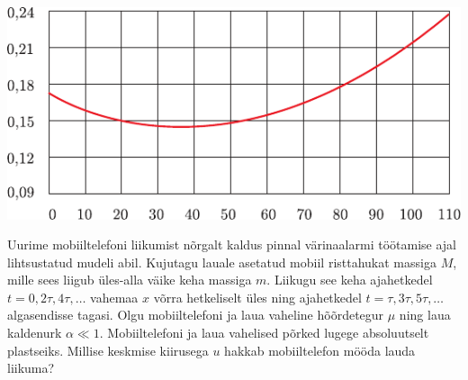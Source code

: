 \documentclass[10pt, twoside]{article}
\begin{document}
{\begin{center}
	\includegraphics[width=\linewidth]{2006-lahg-10-yl}
\end{center}
\probend
\bigskip


Uurime mobiiltelefoni liikumist nõrgalt kaldus pinnal värinaalarmi töötamise
ajal lihtsustatud mudeli abil.
Kujutagu lauale asetatud mobiil risttahukat massiga $M$, mille sees liigub
üles-alla väike keha massiga $m$.
Liikugu see keha ajahetkedel $t=0, 2\tau, 4\tau, \ldots$ vahemaa $x$ võrra
hetkeliselt üles ning ajahetkedel $t=\tau, 3\tau, 5\tau, \ldots$ algasendisse
tagasi.
Olgu mobiiltelefoni ja laua vaheline hõõrdetegur $\mu$ ning laua kaldenurk
$\alpha \ll 1$. Mobiiltelefoni ja laua vahelised põrked lugege absoluutselt
plastseiks.
Millise keskmise kiirusega $u$ hakkab mobiiltelefon mööda lauda liikuma?
\probend
\bigskip


}
\end{document}
